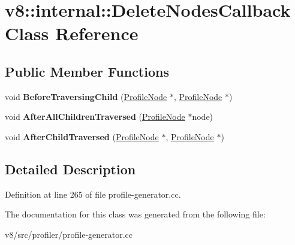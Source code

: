 \hypertarget{classv8_1_1internal_1_1DeleteNodesCallback}{}\section{v8\+:\+:internal\+:\+:Delete\+Nodes\+Callback Class Reference}
\label{classv8_1_1internal_1_1DeleteNodesCallback}
\subsection*{Public Member Functions}
\begin{DoxyCompactItemize}
\item 
\mbox{\label{classv8_1_1internal_1_1DeleteNodesCallback_abedf62098500aa0f61137db8e47430fe}} 
void {\bfseries Before\+Traversing\+Child} (\mbox{\hyperlink{classv8_1_1internal_1_1ProfileNode}{Profile\+Node}} $\ast$, \mbox{\hyperlink{classv8_1_1internal_1_1ProfileNode}{Profile\+Node}} $\ast$)
\item 
\mbox{\label{classv8_1_1internal_1_1DeleteNodesCallback_aaf4155f73f4855c26b2ecee5740eadbb}} 
void {\bfseries After\+All\+Children\+Traversed} (\mbox{\hyperlink{classv8_1_1internal_1_1ProfileNode}{Profile\+Node}} $\ast$node)
\item 
\mbox{\label{classv8_1_1internal_1_1DeleteNodesCallback_a59823e985d117a4d8429e0d198f288bf}} 
void {\bfseries After\+Child\+Traversed} (\mbox{\hyperlink{classv8_1_1internal_1_1ProfileNode}{Profile\+Node}} $\ast$, \mbox{\hyperlink{classv8_1_1internal_1_1ProfileNode}{Profile\+Node}} $\ast$)
\end{DoxyCompactItemize}


\subsection{Detailed Description}


Definition at line 265 of file profile-\/generator.\+cc.



The documentation for this class was generated from the following file\+:\begin{DoxyCompactItemize}
\item 
v8/src/profiler/profile-\/generator.\+cc\end{DoxyCompactItemize}
